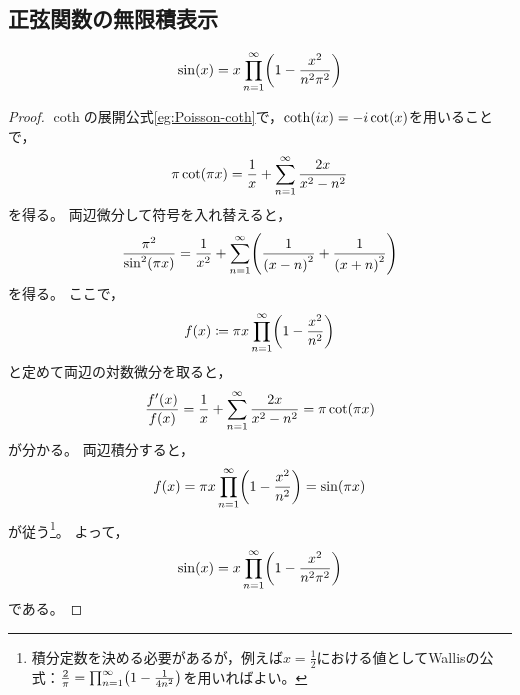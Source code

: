\documentclass[a4paper,draft]{ltjsarticle}
\begin{document}
\subsection{正弦関数の無限積表示}
\begin{thm}[正弦関数の無限積展開]\label{thm:Poisson-sin}
    \begin{equation}
        \fun{\sin}{x}= x\prod_{n=1}^\infty \pare{1-\dfrac{x^2}{n^2\pi^2}}
    \end{equation}
    \begin{proof}
        $\coth$の展開公式\ref{eg:Poisson-coth}で，$\fun{\coth}{ix}=-i\fun{\cot}{x}$を用いることで，
        \begin{equation}
            \pi\fun{\cot}{\pi x}=\dfrac{1}{x}+\sum_{n=1}^\infty\dfrac{2x}{x^2-n^2}
        \end{equation}
        を得る。
        両辺微分して符号を入れ替えると，
        \begin{equation}
            \dfrac{\pi^2}{\fun{\sin^2}{\pi x}}
            =\dfrac{1}{x^2}+\sum_{n=1}^\infty \pare{
                \dfrac{1}{\pare{x-n}^2}+\dfrac{1}{\pare{x+n}^2}
            }
        \end{equation}
        を得る。
        ここで，
        \begin{equation}
            \fun{f}{x}\coloneqq \pi x \prod_{n=1}^\infty \pare{1-\dfrac{x^2}{n^2}}
        \end{equation}
        と定めて両辺の対数微分を取ると，
        \begin{equation}
            \dfrac{\fun{f'}{x}}{\fun{f}{x}}=\dfrac{1}{x}+\sum_{n=1}^\infty\dfrac{2x}{x^2-n^2}=\pi\fun{\cot}{\pi x}
        \end{equation}
        が分かる。
        両辺積分すると，
        \begin{equation}
            \fun{f}{x}=\pi x \prod_{n=1}^\infty \pare{1-\dfrac{x^2}{n^2}}= \fun{\sin}{\pi x}
        \end{equation}
        が従う\footnote{積分定数を決める必要があるが，例えば$x=\frac{1}{2}$における値としてWallisの公式：$\frac{2}{\pi}=\prod_{n=1}^\infty \pare{1-\frac{1}{4n^2}}$を用いればよい。}。
        よって，
        \begin{equation}
            \fun{\sin}{x}=x\prod_{n=1}^\infty\pare{1-\dfrac{x^2}{n^2\pi^2}}
        \end{equation}
        である。
    \end{proof}
\end{thm}
\end{document}
